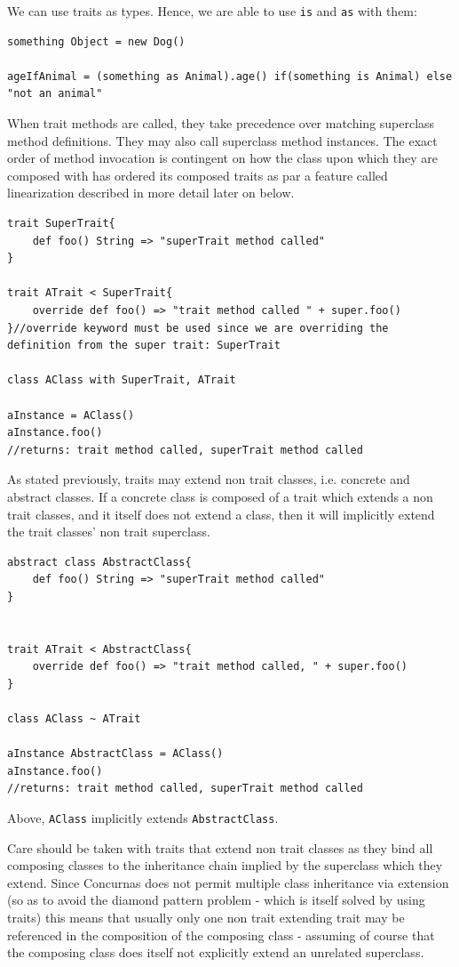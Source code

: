 \documentclass[conc-doc]{subfiles}
\begin{document}
We can use traits as types. Hence, we are able to use \lstinline{is} and \lstinline{as} with them:
\begin{lstlisting}
something Object = new Dog()

ageIfAnimal = (something as Animal).age() if(something is Animal) else "not an animal"
\end{lstlisting}

When trait methods are called, they take precedence over matching superclass method definitions. They may also call superclass method instances. The exact order of method invocation is contingent on how the class upon which they are composed with has ordered its composed traits as par a feature called linearization described in more detail later on below.

\begin{lstlisting}
trait SuperTrait{
	def foo() String => "superTrait method called"
}

trait ATrait < SuperTrait{
	override def foo() => "trait method called " + super.foo()
}//override keyword must be used since we are overriding the definition from the super trait: SuperTrait

class AClass with SuperTrait, ATrait

aInstance = AClass() 
aInstance.foo()
//returns: trait method called, superTrait method called
\end{lstlisting}

As stated previously, traits may extend non trait classes, i.e. concrete and abstract classes. If a concrete class is composed of a trait which extends a non trait classes, and it itself does not extend a class, then it will implicitly extend the trait classes' non trait superclass.

\begin{lstlisting}
abstract class AbstractClass{
	def foo() String => "superTrait method called"
}


trait ATrait < AbstractClass{
	override def foo() => "trait method called, " + super.foo()
}

class AClass ~ ATrait 

aInstance AbstractClass = AClass() 
aInstance.foo()
//returns: trait method called, superTrait method called
\end{lstlisting}

Above, \lstinline{AClass} implicitly extends \lstinline{AbstractClass}. 

Care should be taken with traits that extend non trait classes as they bind all composing classes to the inheritance chain implied by the superclass which they extend. Since Concurnas does not permit multiple class inheritance via extension (so as to avoid the diamond pattern problem - which is itself solved by using traits) this means that usually only one non trait extending trait may be referenced in the composition of the composing class - assuming of course that the composing class does itself not explicitly extend an unrelated superclass.
\end{document}
